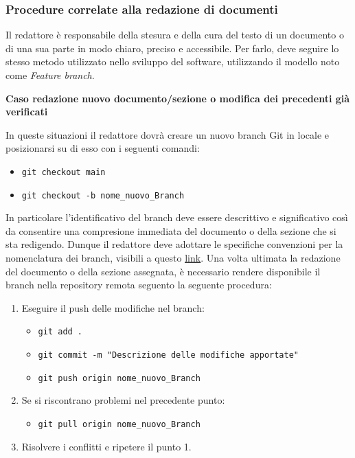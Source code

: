\subsubsection{Procedure correlate alla redazione di documenti}
Il redattore è responsabile della stesura e della cura del testo di un documento o di una sua parte in modo chiaro, preciso e accessibile. Per farlo, deve seguire lo stesso metodo utilizzato nello sviluppo del software, utilizzando il modello noto come \textit{Feature branch}.
\begin{flushleft}
\textbf{Caso redazione nuovo documento/sezione o modifica dei precedenti già verificati}
\end{flushleft}
In queste situazioni il redattore dovrà creare un nuovo branch Git in locale e posizionarsi su di esso con i seguenti comandi:
\begin{itemize}
	\item \texttt{git checkout main}
	\item \texttt{git checkout -b nome\_nuovo\_Branch}
\end{itemize}
In particolare l'identificativo del branch deve essere descrittivo e significativo così da consentire una compresione immediata del documento o della sezione che si sta redigendo. Dunque il redattore deve adottare le specifiche convenzioni per la nomenclatura dei branch, visibili a questo \hyperref[nomenclatura]{\underline{link}}. Una volta ultimata la redazione del documento o della sezione assegnata, è necessario rendere disponibile il branch nella repository remota seguento la seguente procedura:
\begin{enumerate}
	\item Eseguire il push delle modifiche nel branch:
		\begin{itemize}
			\item \texttt{git add .}
			\item \texttt{git commit -m "Descrizione delle modifiche apportate"}
			\item \texttt{git push origin nome\_nuovo\_Branch}
		\end{itemize}
	\item Se si riscontrano problemi nel precedente punto:
		\begin{itemize}
		\item \texttt{git pull origin nome\_nuovo\_Branch}
		\end{itemize}
	\item Risolvere i conflitti e ripetere il punto 1.
\end{enumerate}
